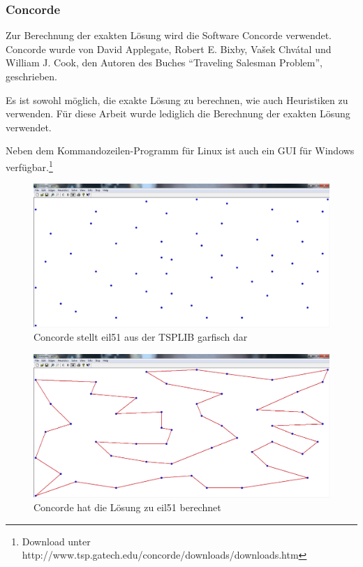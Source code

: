 \documentclass[11pt,a4paper]{article}
\begin{document}
\subsubsection{Concorde}
Zur Berechnung der exakten Lösung wird die Software Concorde verwendet. Concorde wurde von David Applegate, Robert E. Bixby, Vašek Chvátal und William J. Cook, den Autoren des Buches "`Traveling Salesman Problem"'\cite{applegate06}, geschrieben.

Es ist sowohl möglich, die exakte Lösung zu berechnen, wie auch Heuristiken zu verwenden. Für diese Arbeit wurde lediglich die Berechnung der exakten Lösung verwendet.

Neben dem Kommandozeilen-Programm für Linux ist auch ein GUI für Windows verfügbar.\footnote{Download unter http://www.tsp.gatech.edu/concorde/downloads/downloads.htm}

\begin{figure}[H]
        \centering
        \includegraphics[width=14cm]{gfx/concorde_cities}
        \caption{Concorde stellt eil51 aus der TSPLIB garfisch dar}
        \label{img:concorde_cities}
\end{figure}

\begin{figure}[H]
        \centering
        \includegraphics[width=14cm]{gfx/concorde_solution}
        \caption{Concorde hat die Lösung zu eil51 berechnet}
        \label{img:concorde_solution}
\end{figure}
\end{document}
